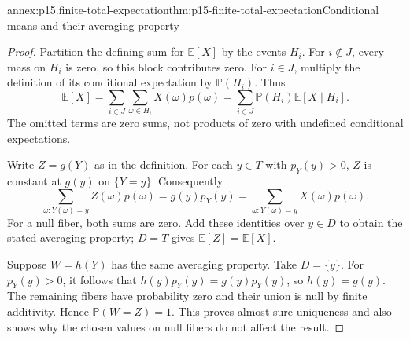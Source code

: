 \begin{annexitem}{annex:p15.finite-total-expectation}{thm:p15-finite-total-expectation}{Conditional\\means and their averaging property}
\begin{proof}
Partition the defining sum for \(\mathbb E[X]\) by the events \(H_i\).
For \(i\notin J\), every mass on \(H_i\) is zero, so this block
contributes zero. For \(i\in J\), multiply the definition of its
conditional expectation by \(\mathbb P(H_i)\). Thus
\[
 \mathbb E[X]
 =\sum_{i\in J}\sum_{\omega\in H_i}X(\omega)p(\omega)
 =\sum_{i\in J}\mathbb P(H_i)\mathbb E[X\mid H_i].
\]
The omitted terms are zero sums, not products of zero with undefined
conditional expectations.

Write \(Z=g(Y)\) as in the definition. For each \(y\in T\) with
\(p_Y(y)>0\), \(Z\) is constant at \(g(y)\) on \(\{Y=y\}\).
Consequently
\[
 \sum_{\omega:Y(\omega)=y}Z(\omega)p(\omega)
 =g(y)p_Y(y)
 =\sum_{\omega:Y(\omega)=y}X(\omega)p(\omega).
\]
For a null fiber, both sums are zero. Add these identities over
\(y\in D\) to obtain the stated averaging property; \(D=T\) gives
\(\mathbb E[Z]=\mathbb E[X]\).

Suppose \(W=h(Y)\) has the same averaging property. Take \(D=\{y\}\).
For \(p_Y(y)>0\), it follows that
\(h(y)p_Y(y)=g(y)p_Y(y)\), so \(h(y)=g(y)\). The remaining
fibers have probability zero and their union is null by finite additivity.
Hence \(\mathbb P(W=Z)=1\). This proves almost-sure uniqueness and also
shows why the chosen values on null fibers do not affect the result.
\end{proof}
\end{annexitem}
